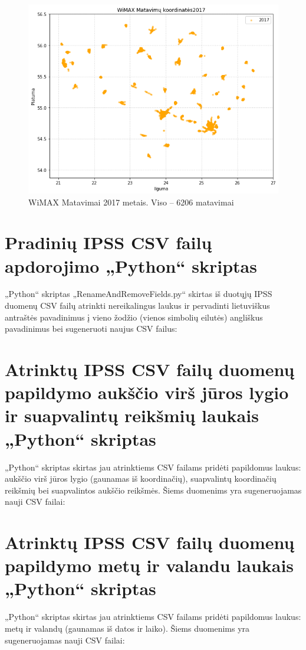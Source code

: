 \documentclass{VUMIFPSbakalaurinis}
\begin{document}
\begin{figure}[H]
	\centering
	\includegraphics[scale=0.33]{img/WiMAX-3}
	\caption{WiMAX Matavimai 2017 metais. Viso – 6206 matavimai}
	\label{img:WiMAX-3}
\end{figure}

\section{Pradinių IPSS CSV failų apdorojimo „Python“ skriptas} \label{script1}
„Python“ skriptas „RenameAndRemoveFields.py“ skirtas iš duotųjų IPSS duomenų CSV failų atrinkti nereikalingus laukus ir pervadinti lietuviškus antraštės pavadinimus į vieno žodžio (vienos simbolių eilutės) angliškus pavadinimus bei sugeneruoti naujus CSV failus:


\section{Atrinktų IPSS CSV failų duomenų papildymo aukščio virš jūros lygio ir suapvalintų reikšmių laukais „Python“ skriptas} \label{script2}
„Python“ skriptas skirtas jau atrinktiems CSV failams pridėti papildomus laukus: aukščio virš jūros lygio (gaunamas iš koordinačių), suapvalintų koordinačių reikšmių bei suapvalintos aukščio reikšmės. Šiems duomenims yra sugeneruojamas nauji CSV failai:


\section{Atrinktų IPSS CSV failų duomenų papildymo metų ir valandu laukais „Python“ skriptas} \label{script3}
„Python“ skriptas skirtas jau atrinktiems CSV failams pridėti papildomus laukus: metų ir valandų (gaunamas iš datos ir laiko). Šiems duomenims yra sugeneruojamas nauji CSV failai:

\end{document}
